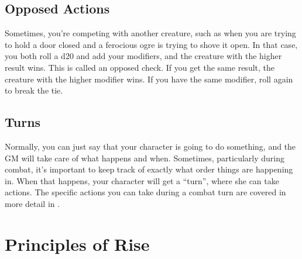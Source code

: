     \subsection{Opposed Actions}
        Sometimes, you're competing with another creature, such as when you are trying to hold a door closed and a ferocious ogre is trying to shove it open.
        In that case, you both roll a d20 and add your modifiers, and the creature with the higher result wins.
        This is called an opposed check.
        If you get the same result, the creature with the higher modifier wins.
        If you have the same modifier, roll again to break the tie.

    \subsection{Turns}
        Normally, you can just say that your character is going to do something, and the GM will take care of what happens and when.
        Sometimes, particularly during combat, it's important to keep track of exactly what order things are happening in.
        When that happens, your character will get a ``turn'', where she can take actions.
        The specific actions you can take during a combat turn are covered in more detail in .

\section{Principles of Rise}

